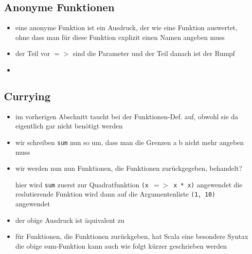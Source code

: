 \subsection{Anonyme Funktionen}
\begin{itemize}
  \item eine anonyme Funktion ist ein Ausdruck, der wie eine Funktion
  auswertet, ohne dass man für diese Funktion explizit einen Namen angeben
  muss
  \item der Teil vor $=>$ sind die Parameter und der Teil danach ist der Rumpf
  
  
  
  
  \item 
\end{itemize}


\subsection{Currying}
\begin{itemize}
  \item im vorherigen Abschnitt taucht bei der Funktionen-Def. auf, obwohl
  sie da eigentlich gar nicht benötigt werden
  \item wir schreiben \texttt{sum} nun so um, dass man die Grenzen a \und 
  b nicht mehr angeben muss
  
  
  
  \item wir werden nun nun Funktionen, die Funktionen zurückgegeben,
  behandelt?
  
  
  
  hier wird \texttt{sum} zuerst zur Quadratfunktion \texttt{(x $=>$ x * x)}
  angewendet \und die reslutierende Funktion wird dann auf die Argumentenliste
  \texttt{(1, 10)} angewendet
  \item der obige Ausdruck ist äquivalent zu 
  
  
  
  \item für Funktionen, die Funktionen zurückgeben, hat Scala eine besondere
  Syntax \und die obige sum-Funktion kann auch wie folgt kürzer geschrieben
  werden
  
  
  
\end{itemize}
\pagebreak


